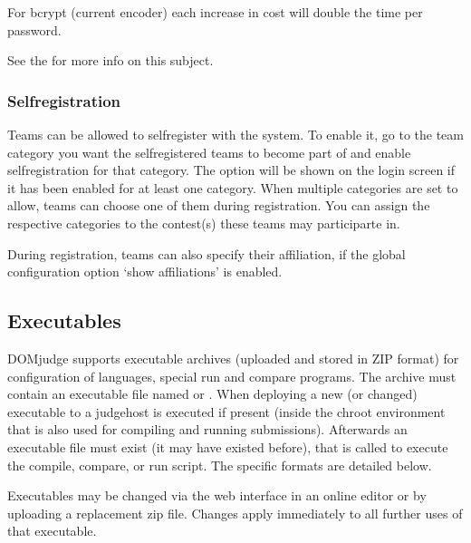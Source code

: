 \documentclass[a4paper,10pt,english,openany]{sphinxmanual}
\begin{document}
\sphinxAtStartPar
For bcrypt (current encoder) each increase in cost will double the time per password.

\sphinxAtStartPar
See the  for more info on this subject.


\subsubsection{Self\sphinxhyphen{}registration}
\label{\detokenize{config-advanced:self-registration}}
\sphinxAtStartPar
Teams can be allowed to self\sphinxhyphen{}register with the system. To enable it, go to
the team category you want the self\sphinxhyphen{}registered teams to become part of and
enable self\sphinxhyphen{}registration for that category. The option will be shown on the
login screen if it has been enabled for at least one category. When multiple
categories are set to allow, teams can choose one of them during registration.
You can assign the respective categories to the contest(s) these teams may
participarte in.

\sphinxAtStartPar
During registration, teams can also specify their affiliation,
if the global configuration option ‘show affiliations’ is enabled.


\subsection{Executables}
\label{\detokenize{config-advanced:executables}}
\sphinxAtStartPar
DOMjudge supports executable archives (uploaded and stored in ZIP
format) for configuration of languages, special run and compare
programs. The archive must contain an executable file named
 or . When deploying a new (or changed)
executable to a judgehost  is executed  if
present (inside the chroot environment that is also used for
compiling and running submissions). Afterwards an executable
file  must exist (it may have existed before), that is
called to execute the compile, compare, or run script. The
specific formats are detailed below.

\sphinxAtStartPar
Executables may be changed via the web interface in an online editor
or by uploading a replacement zip file. Changes apply immediately to
all further uses of that executable.
\end{document}
